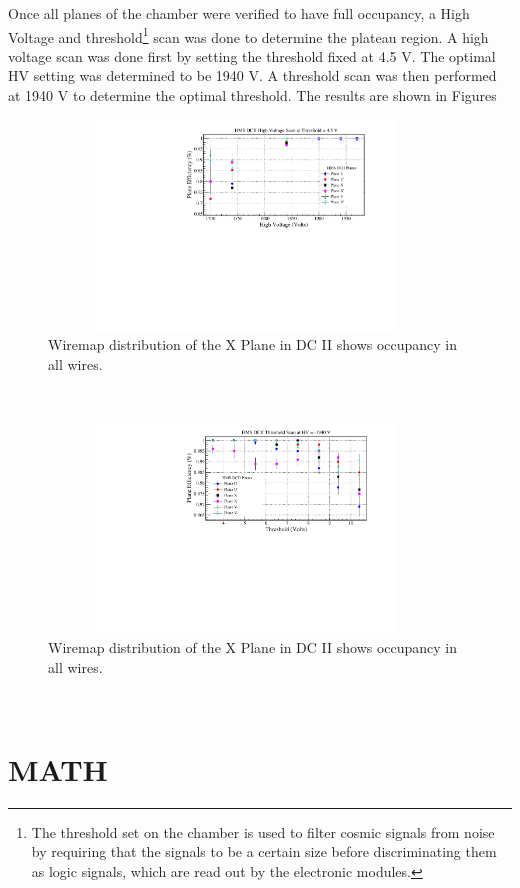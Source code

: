 \documentclass[letterpaper, 10 pt, conference]{ieeeconf}  %
\begin{document}
Once all planes of the chamber were verified to have full occupancy, a High Voltage and threshold\footnote{The threshold set on the chamber is used to filter cosmic signals from noise by requiring that
  the signals to be a certain size before discriminating them as logic signals, which are read out by the electronic modules.} scan was done to determine the plateau region. A high voltage scan was done first
by setting the threshold fixed at 4.5 V. The optimal HV setting was determined to be 1940 V. A threshold scan was then performed at 1940 V to determine the optimal threshold. The results are shown in Figures
\begin{figure}[h!]
  \centering
  \includegraphics[width=4.1in, height=2.2in]{dc2_tests/dc2_hvscan_thrs45.pdf}
  \caption{Wiremap distribution of the X Plane in DC II shows occupancy in all wires.}
  \label{fig:hdc2_wire}
\end{figure} \\
\begin{figure}[h!]
  \centering
  \includegraphics[width=4.1in, height=2.2in]{dc2_tests/dc2_thrsscan_HV_1940V.pdf}
  \caption{Wiremap distribution of the X Plane in DC II shows occupancy in all wires.}
  \label{fig:hdc2_wire}
\end{figure} \\
\section{MATH}
\end{document}
